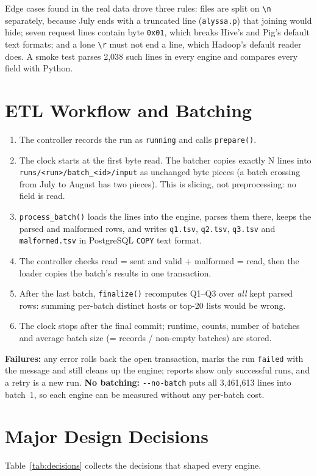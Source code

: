 \documentclass[conference]{IEEEtran}
\newcommand{\code}[1]{\texttt{\small #1}}
\begin{document}
Edge cases found in the real data drove three rules: files are split on \code{\textbackslash n}
separately, because July ends with a truncated line (\code{alyssa.p}) that joining would hide;
seven request lines contain byte \code{0x01}, which breaks Hive's and Pig's default text formats;
and a lone \code{\textbackslash r} must not end a line, which Hadoop's default reader does.
A smoke test parses 2,038 such lines in every engine and compares every field with Python.

\section{ETL Workflow and Batching}
\begin{enumerate}
\item The controller records the run as \code{running} and calls \code{prepare()}.
\item The clock starts at the first byte read. The batcher copies exactly N lines into
  \code{runs/<run>/batch\_<id>/input} as unchanged byte pieces (a batch crossing from July to
  August has two pieces). This is slicing, not preprocessing: no field is read.
\item \code{process\_batch()} loads the lines into the engine, parses them there, keeps the parsed
  and malformed rows, and writes \code{q1.tsv}, \code{q2.tsv}, \code{q3.tsv} and
  \code{malformed.tsv} in PostgreSQL \code{COPY} text format.
\item The controller checks read = sent and valid + malformed = read, then the loader copies the
  batch's results in one transaction.
\item After the last batch, \code{finalize()} recomputes Q1--Q3 over \emph{all} kept parsed rows:
  summing per-batch distinct hosts or top-20 lists would be wrong.
\item The clock stops after the final commit; runtime, counts, number of batches and average batch
  size (= records / non-empty batches) are stored.
\end{enumerate}
\textbf{Failures:} any error rolls back the open transaction, marks the run \code{failed} with the
message and still cleans up the engine; reports show only successful runs, and a retry is a new run.
\textbf{No batching:} \code{-{}-no-batch} puts all 3,461,613 lines into batch~1, so each engine can
be measured without any per-batch cost.

\section{Major Design Decisions}
Table~\ref{tab:decisions} collects the decisions that shaped every engine.
\end{document}
